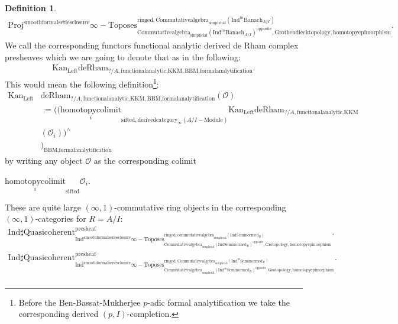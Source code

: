 \documentclass[11pt]{book}
\theoremstyle{definition}
\newtheorem{definition}[theorem]{Definition}
\numberwithin{equation}{section}
\begin{document}
\begin{definition}
\begin{align}
\mathrm{Proj}^\text{smoothformalseriesclosure}\infty-\mathrm{Toposes}^{\mathrm{ringed},\mathrm{Commutativealgebra}_{\mathrm{simplicial}}(\mathrm{Ind}^m\mathrm{Banach}_{A/I})}_{\mathrm{Commutativealgebra}_{\mathrm{simplicial}}(\mathrm{Ind}^m\mathrm{Banach}_{A/I})^\mathrm{opposite},\mathrm{Grothendiecktopology,homotopyepimorphism}}. 
\end{align}
We call the corresponding functors functional analytic derived de Rham complex presheaves which we are going to denote that as in the following:
\begin{align}
\mathrm{Kan}_{\mathrm{Left}}\mathrm{deRham}_{?/A,\text{functionalanalytic,KKM},\text{BBM,formalanalytification}}.	
\end{align}
This would mean the following definition{\footnote{Before the Ben-Bassat-Mukherjee $p$-adic formal analytification we take the corresponding derived $(p,I)$-completion.}}:
\begin{align}
\mathrm{Kan}_{\mathrm{Left}}&\mathrm{deRham}_{?/A,\text{functionalanalytic,KKM},\text{BBM,formalanalytification}}(\mathcal{O})\\
&:=	((\underset{i}{\text{homotopycolimit}}_{\text{sifted},\text{derivedcategory}_{\infty}(A/I-\text{Module})}\mathrm{Kan}_{\mathrm{Left}}\mathrm{deRham}_{?/A,\text{functionalanalytic,KKM}}\\
&(\mathcal{O}_i))^\wedge\\
&)_\text{BBM,formalanalytification}
\end{align}
by writing any object $\mathcal{O}$ as the corresponding colimit 
\begin{center}
$\underset{i}{\text{homotopycolimit}}_\text{sifted}\mathcal{O}_i$.
\end{center}
These are quite large $(\infty,1)$-commutative ring objects in the corresponding $(\infty,1)$-categories for $R=A/I$:
\begin{align}
\mathrm{Ind}\mathrm{\sharp Quasicoherent}^{\text{presheaf}}_{\mathrm{Ind}^\text{smoothformalseriesclosure}\infty-\mathrm{Toposes}^{\mathrm{ringed},\mathrm{commutativealgebra}_{\mathrm{simplicial}}(\mathrm{Ind}\mathrm{Seminormed}_R)}_{\mathrm{Commutativealgebra}_{\mathrm{simplicial}}(\mathrm{Ind}\mathrm{Seminormed}_R)^\mathrm{opposite},\mathrm{Grotopology,homotopyepimorphism}}}. \\
\mathrm{Ind}\mathrm{\sharp Quasicoherent}^{\text{presheaf}}_{\mathrm{Ind}^\text{smoothformalseriesclosure}\infty-\mathrm{Toposes}^{\mathrm{ringed},\mathrm{Commutativealgebra}_{\mathrm{simplicial}}(\mathrm{Ind}^m\mathrm{Seminormed}_R)}_{\mathrm{Commutativealgebra}_{\mathrm{simplicial}}(\mathrm{Ind}^m\mathrm{Seminormed}_R)^\mathrm{opposite},\mathrm{Grotopology,homotopyepimorphism}}}.\\

\end{align}
\end{definition}
\end{document}
